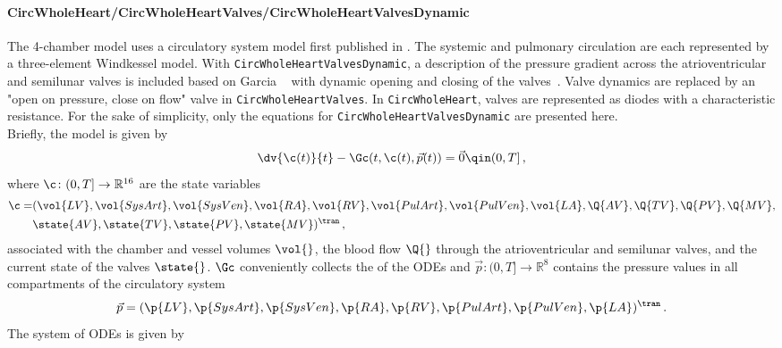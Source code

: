 \paragraph{CircWholeHeart/CircWholeHeartValves/CircWholeHeartValvesDynamic} The 4-chamber model uses a circulatory system model first published in \cite{Gerach-2021}.
The systemic and pulmonary circulation are each represented by a three-element Windkessel model. 
With \verb|CircWholeHeartValvesDynamic|, a description of the pressure gradient across the atrioventricular and semilunar valves is included based on Garcia \etal~\cite{Garcia2005} with dynamic opening and closing of the valves~\cite{Mynard2012}.
Valve dynamics are replaced by an "open on pressure, close on flow" valve in \verb|CircWholeHeartValves|.
In \verb|CircWholeHeart|, valves are represented as diodes with a characteristic resistance.
For the sake of simplicity, only the equations for \verb|CircWholeHeartValvesDynamic| are presented here.
\newline \\
Briefly, the model is given by
\begin{equation}
\dv{\c(t)}{t} - \Gc(t, \c(t),\vec p(t)) = \vec 0 \qin (0,T] \,, \label{eq:C}
\end{equation}
where $\c\colon(0,T]\rightarrow\mathbb{R}^{16}$ are the state variables
\begin{align*}
    \c = 
    &(\vol{LV}, \vol{SysArt}, \vol{SysVen}, \vol{RA}, \vol{RV}, \vol{PulArt}, \vol{PulVen}, \vol{LA}, \Q{AV}, \Q{TV}, \Q{PV}, \Q{MV}, \\
    & \state{AV}, \state{TV}, \state{PV}, \state{MV})^\tran \,,
\end{align*}
 associated with the chamber and vessel volumes $\vol{}$, the blood flow $\Q{}$ through the atrioventricular and semilunar valves, and the current state of the valves $\state{}$.
$\Gc$ conveniently collects the \rhs of the ODEs and $\vec p\colon(0,T]\rightarrow\mathbb{R}^{8}$ contains the pressure values in all compartments of the circulatory system
\begin{equation*}
    \vec p = (\p{LV}, \p{SysArt}, \p{SysVen}, \p{RA}, \p{RV}, \p{PulArt}, \p{PulVen}, \p{LA})^\tran \,.
\end{equation*}
The system of ODEs is given by 

